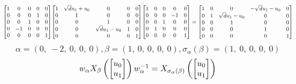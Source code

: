 \documentclass[11pt]{article}
\theoremstyle{definition}
\begin{document}
\[
\scaletoalign{\textwidth}{{\left[\begin{matrix}1 & 0 & 0 & 0 & 0\\0 & 0 & 0 & 1 & 0\\0 & 0 & 1 & 0 & 0\\0 & -1 & 0 & 0 & 0\\0 & 0 & 0 & 0 & 1\end{matrix}\right]} {\left[\begin{matrix}1 & \sqrt{d} u_{1} + u_{0} & 0 & 0 & 0\\0 & 1 & 0 & 0 & 0\\0 & 0 & 1 & 0 & 0\\0 & 0 & \sqrt{d} u_{1} - u_{0} & 1 & 0\\0 & 0 & 0 & 0 & 1\end{matrix}\right]} {\left[\begin{matrix}1 & 0 & 0 & 0 & 0\\0 & 0 & 0 & -1 & 0\\0 & 0 & 1 & 0 & 0\\0 & 1 & 0 & 0 & 0\\0 & 0 & 0 & 0 & 1\end{matrix}\right]} = {\left[\begin{matrix}1 & 0 & 0 & - \sqrt{d} u_{1} - u_{0} & 0\\0 & 1 & \sqrt{d} u_{1} - u_{0} & 0 & 0\\0 & 0 & 1 & 0 & 0\\0 & 0 & 0 & 1 & 0\\0 & 0 & 0 & 0 & 1\end{matrix}\right]}}
\]
\[
\alpha = \left( 0, \  -2, \  0, \  0, \  0\right), \beta = \left( 1, \  0, \  0, \  0, \  0\right), \sigma_{\alpha}(\beta) = \left( 1, \  0, \  0, \  0, \  0\right)
\]
\[
\scaletoalign{\textwidth}{w_{\alpha} X_{\beta}\left(\left[\begin{matrix}u_{0}\\u_{1}\end{matrix}\right]\right) w_{\alpha}^{-1} = X_{\sigma_{\alpha}\left(\beta\right)}\left(\left[\begin{matrix}u_{0}\\u_{1}\end{matrix}\right]\right)}
\]
\end{document}
